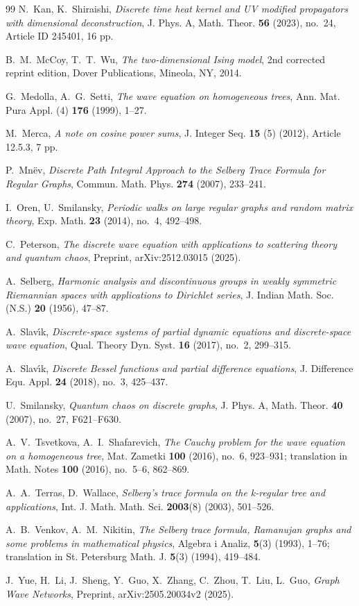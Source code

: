 \documentclass[reqno,10pt]{amsart}
\theoremstyle{definition}
\numberwithin{equation}{section}
\begin{document}
\begin{thebibliography}{99}
 N.~Kan, K.~Shiraishi, \textit{Discrete time heat kernel and UV modified propagators with dimensional deconstruction}, J. Phys. A, Math. Theor. \textbf{56}  (2023), no.~24, Article ID 245401, 16 pp.

 B.~M.~McCoy, T.~T.~Wu, \textit{The two-dimensional Ising model}, 2nd corrected reprint edition, Dover Publications, Mineola, NY, 2014.

 G.~Medolla, A.~G.~Setti, \textit{The wave equation on
homogeneous trees}, Ann. Mat. Pura Appl. (4) \textbf{176} (1999), 1--27.

 M.~Merca, \textit{A note on cosine power sums}, J. Integer Seq. \textbf{15} (5) (2012), Article 12.5.3, 7 pp.

P.~Mn\"ev, \textit{Discrete Path Integral Approach to the Selberg Trace Formula for Regular Graphs}, Commun. Math. Phys. \textbf{274} (2007), 233--241.

 I.~Oren, U.~Smilansky, \textit{Periodic walks on large regular graphs and random matrix theory}, Exp. Math. \textbf{23} (2014), no.~4, 492--498.

 C.~Peterson, \textit{The discrete wave equation with applications to scattering theory and quantum chaos}, Preprint, arXiv:2512.03015 (2025).

 A.~Selberg, \textit{Harmonic analysis and discontinuous groups in weakly symmetric Riemannian spaces with applications to Dirichlet series}, J. Indian Math. Soc. (N.S.) \textbf{20} (1956), 47--87.

 A.~Slav\'{\i}k, \textit{Discrete-space systems of partial dynamic equations and discrete-space wave equation}, Qual. Theory Dyn. Syst. \textbf{16} (2017), no.~2, 299--315.

 A.~Slav\'{\i}k, \textit{Discrete Bessel functions and partial difference equations}, J. Difference Equ. Appl. \textbf{24} (2018), no.~3,
425--437.

 U.~Smilansky, \textit{Quantum chaos on discrete graphs}, J. Phys. A, Math. Theor. \textbf{40} (2007), no.~27, F621--F630.

 A.~V.~Tsvetkova, A.~I.~Shafarevich, \textit{The Cauchy problem for the wave equation on a homogeneous tree}, Mat. Zametki \textbf{100} (2016), no.~6, 923--931; translation in Math. Notes \textbf{100} (2016), no.~5--6, 862--869.

 A.~A.~Terras, D.~Wallace, \textit{Selberg's trace formula on the
k-regular tree and applications}, Int. J. Math. Math. Sci. \textbf{2003}(8) (2003), 501--526.

 A.~B.~Venkov, A.~M.~Nikitin, \textit{The Selberg trace formula, Ramanujan graphs and some problems in mathematical physics}, Algebra i Analiz, \textbf{5}(3) (1993), 1--76; translation in St. Petersburg Math. J. \textbf{5}(3) (1994), 419--484.

 J.~Yue, H.~Li, J.~Sheng, Y.~Guo, X.~Zhang, C.~Zhou, T.~Liu, L.~Guo, \textit{Graph Wave Networks}, Preprint, arXiv:2505.20034v2 (2025).


\end{thebibliography}
\end{document}
